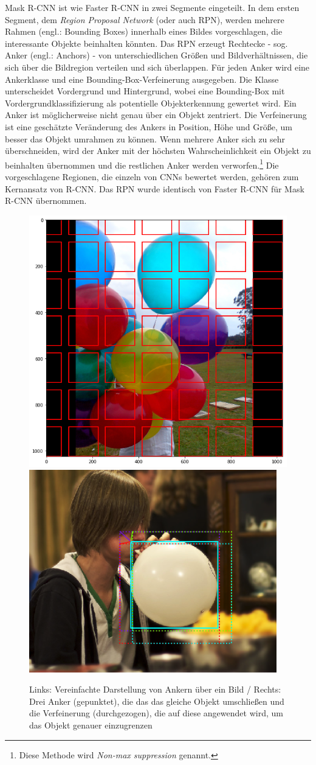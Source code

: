 \noindent
Mask R-CNN ist wie Faster R-CNN in zwei Segmente eingeteilt. In dem ersten Segment, dem \textit{Region Proposal Network} (oder auch RPN), werden mehrere Rahmen (engl.: Bounding Boxes) innerhalb eines Bildes vorgeschlagen, die interessante Objekte beinhalten könnten. Das RPN erzeugt Rechtecke - sog. Anker (engl.: Anchors) - von unterschiedlichen Größen und Bildverhältnissen, die sich über die Bildregion verteilen und sich überlappen. Für jeden Anker wird eine Ankerklasse und eine Bounding-Box-Verfeinerung ausgegeben. Die Klasse unterscheidet Vordergrund und Hintergrund, wobei eine Bounding-Box mit Vordergrundklassifizierung als potentielle Objekterkennung gewertet wird. Ein Anker ist möglicherweise nicht genau über ein Objekt zentriert. Die Verfeinerung ist eine geschätzte Veränderung des Ankers in Position, Höhe und Größe, um besser das Objekt umrahmen zu können. Wenn mehrere Anker sich zu sehr überschneiden, wird der Anker mit der höchsten Wahrscheinlichkeit ein Objekt zu beinhalten übernommen und die restlichen Anker werden verworfen.\footnote{Diese Methode wird \textit{Non-max suppression} genannt.}\cite{ref:matterport:maskrcnn}\cite[S. 3ff.]{ref:faster-r-cnn} Die vorgeschlagene Regionen, die einzeln von CNNs bewertet werden, gehören zum Kernansatz von R-CNN. Das RPN wurde identisch von Faster R-CNN für Mask R-CNN übernommen.\cite[S. 3]{ref:maskrcnn} 
\\
\begin{figure}[ht]
  \centering
  \includegraphics[width=.45\textwidth]{pics/rpn-anchors.png}
  \includegraphics[width=.45\textwidth]{pics/rpn-refinement.png}
  \caption[RPN-Anker]{Links: Vereinfachte Darstellung von Ankern über ein Bild\cite{ref:matterport:maskrcnn} / Rechts: Drei Anker (gepunktet), die das das gleiche Objekt umschließen und die Verfeinerung (durchgezogen), die auf diese angewendet wird, um das Objekt genauer einzugrenzen\cite{ref:matterport:maskrcnn}}
  \label{fig:rpn}
\end{figure}


